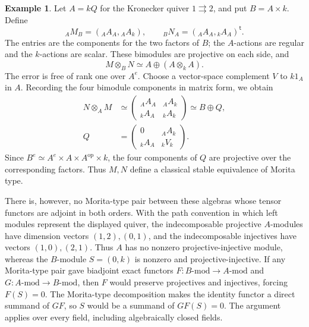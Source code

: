 \documentclass[12pt,a4paper,english,reqno]{amsart}
\numberwithin{equation}{section}
\theoremstyle{plain}
\theoremstyle{definition}
\newtheorem{example}[theorem]{Example}
\begin{document}
\begin{example}
\label{ex:adjoint-kronecker-extra-block}
Let $A=kQ$ for the Kronecker quiver $1\rightrightarrows2$, and put
$B=A\times k$.  Define
\[
 {}_AM_B=({}_AA_A,{}_AA_k),\qquad
 {}_BN_A=({}_AA_A,{}_kA_A)^{\mathsf t}.
\]
The entries are the components for the two factors of $B$;
the $A$-actions are regular and the $k$-actions are scalar.
These bimodules are projective on each side, and
\begin{equation}
 M\otimes_BN\simeq A\oplus(A\otimes_kA).
 \label{eq:adjoint-extra-block-first}
\end{equation}
The error is free of rank one over $A^e$.
Choose a vector-space complement $V$ to $k1_A$ in $A$.
Recording the four bimodule components in matrix form, we obtain
\begin{equation}
 \begin{split}
 N\otimes_AM
 &\simeq
 \begin{pmatrix}{}_AA_A&{}_AA_k\\{}_kA_A&{}_kA_k\end{pmatrix}
 \simeq B\oplus Q,\\
 Q&=
 \begin{pmatrix}0&{}_AA_k\\{}_kA_A&{}_kV_k\end{pmatrix}.
 \end{split}
 \label{eq:adjoint-extra-block-second}
\end{equation}
Since $B^e\simeq A^e\times A\times A^{\mathrm{op}}\times k$,
the four components of $Q$ are projective over the corresponding
factors.  Thus $M,N$ define a classical stable equivalence of Morita type.

There is, however, no Morita-type pair between these algebras whose
tensor functors are adjoint in both orders.  With the path convention in which
left modules represent the displayed quiver, the indecomposable
projective $A$-modules have dimension vectors $(1,2),(0,1)$,
and the indecomposable injectives have vectors $(1,0),(2,1)$.
Thus $A$ has no nonzero projective-injective module, whereas the
$B$-module $S=(0,k)$ is nonzero and projective-injective.
If any Morita-type pair gave biadjoint exact functors
$F:B\text{-}\mathrm{mod}\to A\text{-}\mathrm{mod}$ and
$G:A\text{-}\mathrm{mod}\to B\text{-}\mathrm{mod}$, then $F$
would preserve projectives and injectives, forcing $F(S)=0$.
The Morita-type decomposition makes the identity functor a direct
summand of $GF$, so $S$ would be a summand of $GF(S)=0$.
The argument applies over every field, including algebraically closed
fields.
\end{example}
\end{document}
